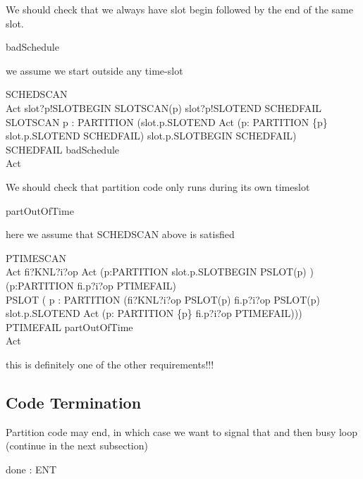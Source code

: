 We should check that we always have slot begin followed by the end of the
same slot.
\begin{circus}

\circchannel badSchedule
\end{circus}
we assume we start outside any time-slot
\begin{circus}
\circprocess SCHEDSCAN \circdef \circbegin\\
  Act \circdef slot?p!SLOTBEGIN \then  SLOTSCAN(p)
              \extchoice  slot?p!SLOTEND   \then  SCHEDFAIL\\
  SLOTSCAN \circdef \circvar p : PARTITION \circspot
        (slot.p.SLOTEND   \then  Act
        \extchoice  (\Extchoice  p: PARTITION \cap \{p\} \circspot slot.p.SLOTEND \then  SCHEDFAIL)
        \extchoice  slot.p.SLOTBEGIN \then  SCHEDFAIL)\\
  SCHEDFAIL \circdef badSchedule \then \Stop\\
\circspot Act\\
\circend
\end{circus}
We should check that partition code only runs during its own timeslot
\begin{circus}

\circchannel partOutOfTime
\end{circus}
here we assume that SCHEDSCAN above is satisfied
\begin{circus}
\circprocess PTIMESCAN \circdef \circbegin\\
  Act \circdef fi?KNL?i?op  \then  Act
            \extchoice  (\Extchoice  p:PARTITION \circspot slot.p.SLOTBEGIN \then  PSLOT(p) )
            \extchoice  (\Extchoice  p:PARTITION \circspot fi.p?i?op        \then  PTIMEFAIL)\\
PSLOT  \circdef( \circvar p : PARTITION \circspot (fi?KNL?i?op    \then  PSLOT(p)
            \extchoice  fi.p?i?op      \then  PSLOT(p)
            \extchoice  slot.p.SLOTEND \then  Act
            \extchoice  (\Extchoice  p: PARTITION \cap \{p\} \circspot fi.p?i?op \then  PTIMEFAIL)))\\
PTIMEFAIL \circdef partOutOfTime \then  \Stop\\
\circspot Act\\
\circend
\end{circus}
this is definitely one of the other requirements!!!

\subsection{Code Termination}
Partition code may end,
in which case we want to signal that and then busy loop (continue in the next subsection)
\begin{circus}
\circchannel done : ENT
\end{circus}


